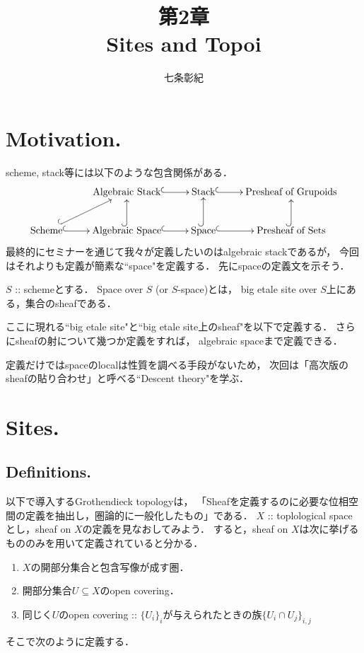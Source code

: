 


\title{第2章 \\ Sites and Topoi}
\author{七条彰紀}
\maketitle
\tableofcontents
\vspace{10pt}

\section{Motivation.}
scheme, stack等には以下のような包含関係がある．
\[\xymatrix{
    {} & \text{Algebraic Stack} \ar@{^{(}->}[r]& \text{Stack} \ar@{^{(}->}[r]& \text{Presheaf of Grupoids} \\
    \text{Scheme} \ar@{^{(}->}[r]\ar@{^{(}->}[ru]& \text{Algebraic Space} \ar@{^{(}->}[r]\ar@{^{(}->}[u]&
        \text{Space} \ar@{^{(}->}[r]\ar@{^{(}->}[u]& \text{Presheaf of Sets} \ar@{^{(}->}[u]
}\]
最終的にセミナーを通じて我々が定義したいのはalgebraic stackであるが，
今回はそれよりも定義が簡素な``space"を定義する．
先にspaceの定義文を示そう．

\begin{Def}
    $S$ :: schemeとする．
    Space over $S$ (or $S$-space)とは，
    big etale site over $S$上にある，集合のsheafである．
\end{Def}
ここに現れる``big etale site"と``big etale site上のsheaf"を以下で定義する．
さらにsheafの射について幾つか定義をすれば，
algebraic spaceまで定義できる．

定義だけではspaceのlocalは性質を調べる手段がないため，
次回は「高次版のsheafの貼り合わせ」と呼べる``Descent theory"を学ぶ．

\section{Sites.}

\subsection{Definitions.}
以下で導入するGrothendieck topologyは，
「Sheafを定義するのに必要な位相空間の定義を抽出し，圏論的に一般化したもの」である．
$X$ :: toplological spaceとし，sheaf on $X$の定義を見なおしてみよう．
すると，sheaf on  $X$は次に挙げるもののみを用いて定義されていると分かる．
\begin{enumerate}
    \item $X$の開部分集合と包含写像が成す圏．
    \item 開部分集合$U \subseteq X$のopen covering．
    \item 同じく$U$のopen covering :: $\{U_i\}_i$が与えられたときの族$\{ U_i \cap U_j \}_{i,j}$
\end{enumerate}
そこで次のように定義する．

